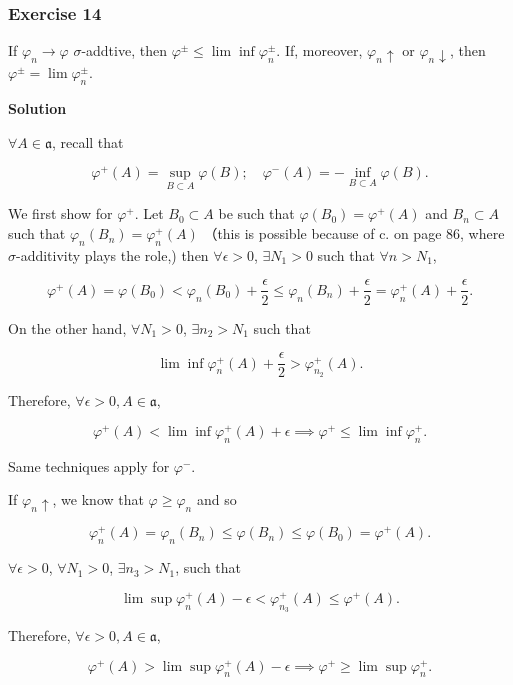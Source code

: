 \documentclass[
]{article}
\begin{document}
\hypertarget{exercise-14}{%
  \subsubsection{Exercise 14}\label{exercise-14}}

If \(\varphi_n \rightarrow \varphi\) \(\sigma\)-addtive, then
\(\varphi ^\pm \le \lim \inf \varphi_n ^\pm\). If, moreover,
\(\varphi_n \uparrow\) or \(\varphi_n \downarrow\), then
\(\varphi^{ \pm}=\lim \varphi_n ^\pm\).

\textbf{Solution}

\(\forall A \in \mathfrak a\), recall that

\[\varphi^+(A) = \sup_{B\subset A}\varphi(B); \quad \varphi^-(A) = -\inf_{B\subset A} \varphi(B).\]

We first show for \(\varphi^+\). Let \(B_0 \subset A\) be such that
\(\varphi(B_0) = \varphi^+(A)\) and \(B_n \subset A\) such that
\(\varphi_n(B_n) = \varphi_n^+(A)\) （this is possible because of c. on
page 86, where \(\sigma\)-additivity plays the role,) then
\(\forall \epsilon > 0\), \(\exists N_1 > 0\) such that
\(\forall n > N_1\),

\[\varphi^+(A) = \varphi(B_0) < \varphi_n(B_0) + \frac{\epsilon}{2} \le \varphi_n(B_n)+ \frac{\epsilon}{2} = \varphi_n^+(A)+ \frac{\epsilon}{2}.\]

On the other hand, \(\forall N_1 > 0\), \(\exists n_2 > N_1\) such that

\[\lim\inf \varphi_{n}^+(A) + \frac{\epsilon}{2} > \varphi_{n_2}^+(A).\]

Therefore, \(\forall \epsilon > 0, A\in \mathfrak a\),

\[\varphi^+(A) < \lim\inf\varphi_n^+(A) + \epsilon \implies \varphi^+ \le \lim\inf \varphi^+_n.\]

Same techniques apply for \(\varphi^-\).

If \(\varphi_n\uparrow\), we know that \(\varphi \ge \varphi_n\) and so

\[\varphi^+_n(A) = \varphi_n(B_n) \le \varphi(B_n) \le \varphi(B_0) = \varphi^+(A).\]

\(\forall \epsilon > 0\), \(\forall N_1 > 0\), \(\exists n_3 > N_1\),
such that

\[\lim\sup \varphi_n^+(A) - \epsilon < \varphi_{n_3}^+(A)\le \varphi^+(A).\]

Therefore, \(\forall \epsilon > 0, A\in \mathfrak a\),

\[\varphi^+(A) > \lim\sup\varphi_n^+(A)  - \epsilon \implies \varphi^+ \ge \lim\sup\varphi_n^+.\]
\end{document}

